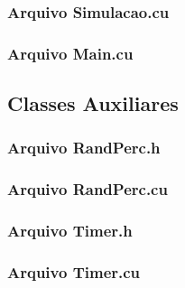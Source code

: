 \subsubsection{Arquivo Simulacao.cu}



\newpage

\subsubsection{Arquivo Main.cu}




\newpage

\subsection{Classes Auxiliares}

\subsubsection{Arquivo RandPerc.h}



\newpage

\subsubsection{Arquivo RandPerc.cu}



\newpage

\subsubsection{Arquivo Timer.h}



\newpage

\subsubsection{Arquivo Timer.cu}

